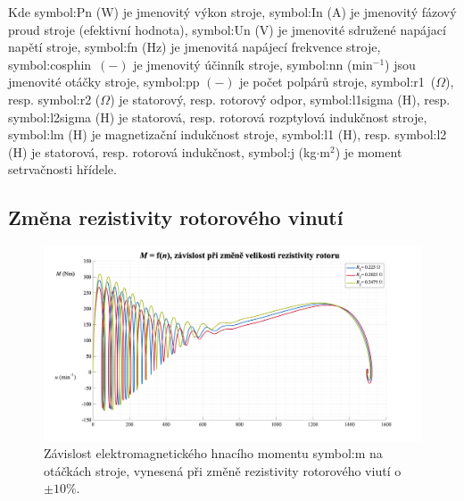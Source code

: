 \documentclass[a4paper, twoside, 11pt]{article}
\newcommand{\fbar}{\FloatBarrier}
\begin{document}
        \vspace*{1cm}
Kde \gls{symbol:Pn} (W) je jmenovitý výkon stroje, \gls{symbol:In} (A) je jmenovitý fázový proud stroje (efektivní hodnota), \gls{symbol:Un} (V) je jmenovité sdružené napájací napětí stroje, \gls{symbol:fn} (Hz) je jmenovitá napájecí frekvence stroje, \gls{symbol:cosphin}~$(-)$ je jmenovitý účinník stroje, \gls{symbol:nn} (min$^{-1}$) jsou jmenovité otáčky stroje, \gls{symbol:pp} $(-)$ je počet polpárů stroje, \gls{symbol:r1}~($\Omega$), resp. \gls{symbol:r2} ($\Omega$) je statorový, resp. rotorový odpor, \gls{symbol:l1sigma} (H), resp. \gls{symbol:l2sigma} (H) je statorová, resp. rotorová rozptylová  indukčnost stroje, \gls{symbol:lm} (H) je magnetizační indukčnost stroje, \gls{symbol:l1} (H), resp. \gls{symbol:l2} (H) je statorová, resp. rotorová indukčnost, \gls{symbol:j} (kg$\cdot$m$^{2}$) je moment setrvačnosti hřídele.\par

\newpage
    \subsection{Změna rezistivity rotorového vinutí}
        \begin{figure}[htbp!]
            \centering
            \includegraphics[width=1\textwidth]{src/png/mh_dyn_nGraphR2.png}
            \caption{Závislost elektromagnetického hnacího momentu \gls{symbol:m} na otáčkách stroje, vynesená při změně rezistivity rotorového viutí o $\pm 10 \%$.}
            \label{fig:mh_dyn_nGraphR2}
        \end{figure}

    \fbar
\end{document}
